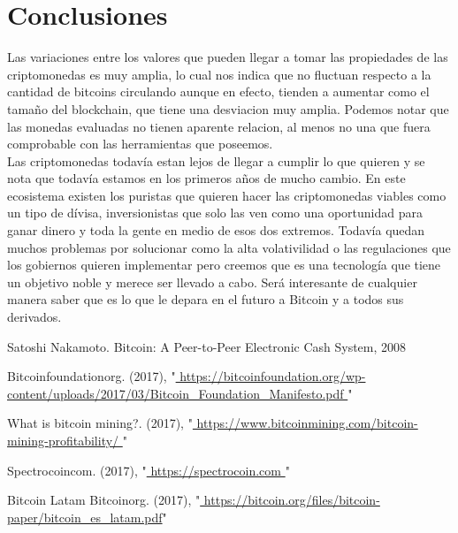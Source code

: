 \documentclass[12pt,letterpaper]{article}
\begin{document}
\newpage
 
\section{Conclusiones}
	Las variaciones entre los valores que pueden llegar a tomar las propiedades de las criptomonedas es muy amplia, lo cual nos indica que no fluctuan respecto a la cantidad de bitcoins circulando aunque en efecto, tienden a aumentar como el tama\~no del blockchain, que tiene una desviacion muy amplia. Podemos notar que las monedas evaluadas no tienen aparente relacion, al menos no una que fuera comprobable con las herramientas que poseemos.
    \\
    Las criptomonedas todav\'ia estan lejos de llegar a cumplir lo que quieren y se nota que todav\'ia estamos en los primeros a\~nos de mucho cambio. En este ecosistema existen los puristas que quieren hacer las criptomonedas viables como un tipo de d\'ivisa, inversionistas que solo las ven como una oportunidad para ganar dinero y toda la gente en medio de esos dos extremos. Todav\'ia quedan muchos problemas por solucionar como la alta volativilidad o las regulaciones que los gobiernos
    quieren implementar pero creemos que es una tecnolog\'ia que tiene un objetivo noble y merece ser llevado a cabo. Ser\'a interesante de cualquier manera saber que es lo que le depara en el futuro a Bitcoin y a todos sus derivados.
 


\begin{thebibliography}{5}

Satoshi Nakamoto. Bitcoin: A Peer-to-Peer Electronic Cash System, 2008

Bitcoinfoundationorg. (2017),
"\url{ https://bitcoinfoundation.org/wp-content/uploads/2017/03/Bitcoin_Foundation_Manifesto.pdf }"


What is bitcoin mining?. (2017),
"\url{ https://www.bitcoinmining.com/bitcoin-mining-profitability/ }"


Spectrocoincom. (2017),
"\url{ https://spectrocoin.com }"


Bitcoin Latam
Bitcoinorg. (2017), 
 "\url{ https://bitcoin.org/files/bitcoin-paper/bitcoin_es_latam.pdf}"

\end{thebibliography}
\end{document}
